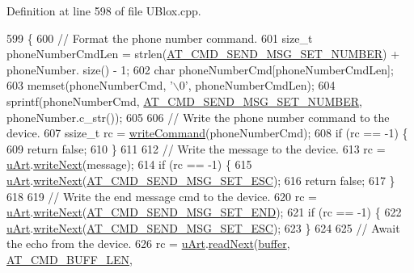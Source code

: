 Definition at line 598 of file U\+Blox.\+cpp.


\begin{DoxyCode}
599 \{
600     \textcolor{comment}{// Format the phone number command.}
601     \textcolor{keywordtype}{size\_t} phoneNumberCmdLen = strlen(\hyperlink{_u_blox_8cpp_acf7cbfdab41d0b5a67edb28d7c305ae6}{AT\_CMD\_SEND\_MSG\_SET\_NUMBER}) + phoneNumber.
      size() - 1;
602     \textcolor{keywordtype}{char} phoneNumberCmd[phoneNumberCmdLen];
603     memset(phoneNumberCmd, \textcolor{charliteral}{'\(\backslash\)0'}, phoneNumberCmdLen);
604     sprintf(phoneNumberCmd, \hyperlink{_u_blox_8cpp_acf7cbfdab41d0b5a67edb28d7c305ae6}{AT\_CMD\_SEND\_MSG\_SET\_NUMBER}, phoneNumber.c\_str());
605 
606     \textcolor{comment}{// Write the phone number command to the device.}
607     ssize\_t rc = \hyperlink{class_u_blox_af604d1897a66192bf1c2a11997f2634d}{writeCommand}(phoneNumberCmd);
608     \textcolor{keywordflow}{if} (rc == -1) \{
609         \textcolor{keywordflow}{return} \textcolor{keyword}{false};
610     \}
611 
612     \textcolor{comment}{// Write the message to the device.}
613     rc = \hyperlink{class_u_blox_a034c0463d1c199d094d657c8ebb151e8}{uArt}.\hyperlink{class_u_art_aad1ddb133fe430a92527584eec2e674f}{writeNext}(message);
614     \textcolor{keywordflow}{if} (rc == -1) \{
615         \hyperlink{class_u_blox_a034c0463d1c199d094d657c8ebb151e8}{uArt}.\hyperlink{class_u_art_aad1ddb133fe430a92527584eec2e674f}{writeNext}(\hyperlink{_u_blox_8cpp_a55baec9e81b0e7ca98075f5797df7b50}{AT\_CMD\_SEND\_MSG\_SET\_ESC});
616         \textcolor{keywordflow}{return} \textcolor{keyword}{false};
617     \}
618 
619     \textcolor{comment}{// Write the end message cmd to the device.}
620     rc = \hyperlink{class_u_blox_a034c0463d1c199d094d657c8ebb151e8}{uArt}.\hyperlink{class_u_art_aad1ddb133fe430a92527584eec2e674f}{writeNext}(\hyperlink{_u_blox_8cpp_ae495e4181733f7d2e807dbff58609e69}{AT\_CMD\_SEND\_MSG\_SET\_END});
621     \textcolor{keywordflow}{if} (rc == -1) \{
622         \hyperlink{class_u_blox_a034c0463d1c199d094d657c8ebb151e8}{uArt}.\hyperlink{class_u_art_aad1ddb133fe430a92527584eec2e674f}{writeNext}(\hyperlink{_u_blox_8cpp_a55baec9e81b0e7ca98075f5797df7b50}{AT\_CMD\_SEND\_MSG\_SET\_ESC});
623     \}
624 
625     \textcolor{comment}{// Await the echo from the device.}
626     rc = \hyperlink{class_u_blox_a034c0463d1c199d094d657c8ebb151e8}{uArt}.\hyperlink{class_u_art_aa4818ca67447e251680b4b8d28c8bba5}{readNext}(\hyperlink{class_u_blox_a6ca4b90f3dc4e856181dce1ebda6f82c}{buffer}, \hyperlink{_u_blox_8h_aad458adf8f40cbcc1074061f226a112e}{AT\_CMD\_BUFF\_LEN}, 

\end{DoxyCode}
